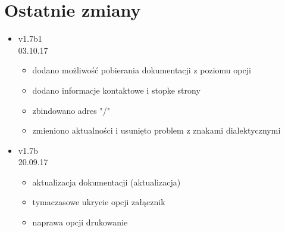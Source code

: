 \documentclass[12pt,a4paper]{article}
\begin{document}
\section{Ostatnie zmiany}
\begin{itemize}
\item v1.7b1\\
03.10.17
\begin{itemize}
\item dodano możliwość pobierania dokumentacji z poziomu opcji
\item dodano informacje kontaktowe i stopke strony 
\item zbindowano adres "/"
\item zmieniono aktualności i usunięto problem z znakami dialektycznymi 
\end{itemize}
\item v1.7b\\ 
20.09.17
\begin{itemize}
\item aktualizacja dokumentacji (aktualizacja)
\item tymaczasowe ukrycie opcji załącznik
\item naprawa opcji drukowanie
\end{itemize}
\end{itemize}
\end{document}

